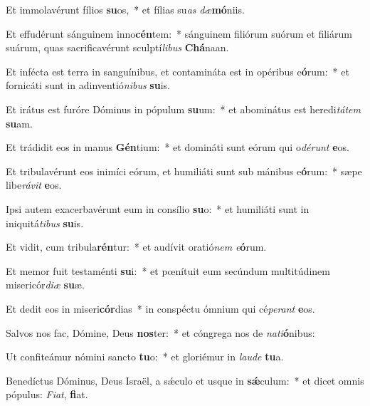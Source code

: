 \item Et immolavérunt fílios \textbf{su}os,~* et fílias su\textit{as} \textit{dæ}\textbf{mó}niis.
\item Et effudérunt sánguinem inno\textbf{cén}tem:~* sánguinem filiórum suórum et filiárum suárum, quas sacrificavérunt sculptí\textit{li}\textit{bus} \textbf{Chá}naan.
\item Et infécta est terra in sanguínibus, et contamináta est in opéribus e\textbf{ó}rum:~* et fornicáti sunt in adinventió\textit{ni}\textit{bus} \textbf{su}is.
\item Et irátus est furóre Dóminus in pópulum \textbf{su}um:~* et abominátus est heredi\textit{tá}\textit{tem} \textbf{su}am.
\item Et trádidit eos in manus \textbf{Gén}tium:~* et domináti sunt eórum qui o\textit{dé}\textit{runt} \textbf{e}os.
\item Et tribulavérunt eos inimíci eórum, et humiliáti sunt sub mánibus e\textbf{ó}rum:~* sæpe libe\textit{rá}\textit{vit} \textbf{e}os.
\item Ipsi autem exacerbavérunt eum in consílio \textbf{su}o:~* et humiliáti sunt in iniquitá\textit{ti}\textit{bus} \textbf{su}is.
\item Et vidit, cum tribula\textbf{rén}tur:~* et audívit oratió\textit{nem} \textit{e}\textbf{ó}rum.
\item Et memor fuit testaménti \textbf{su}i:~* et pœnítuit eum secúndum multitúdinem misericór\textit{di}\textit{æ} \textbf{su}æ.
\item Et dedit eos in miseri\textbf{cór}dias~* in conspéctu ómnium qui cé\textit{pe}\textit{rant} \textbf{e}os.
\item Salvos nos fac, Dómine, Deus \textbf{nos}ter:~* et cóngrega nos de \textit{na}\textit{ti}\textbf{ó}nibus:
\item Ut confiteámur nómini sancto \textbf{tu}o:~* et gloriémur in \textit{lau}\textit{de} \textbf{tu}a.
\item Benedíctus Dóminus, Deus Israël, a sǽculo et usque in \textbf{sǽ}culum:~* et dicet omnis pópulus: \textit{Fi}\textit{at}, \textbf{fi}at.
